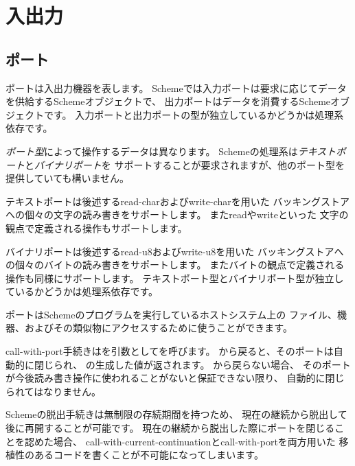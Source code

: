 \section{入出力}

\subsection{ポート}
\label{portsection}

ポートは入出力機器を表します。
Schemeでは入力ポートは要求に応じてデータを供給するSchemeオブジェクトで、
出力ポートはデータを消費するSchemeオブジェクトです。
入力ポートと出力ポートの型が独立しているかどうかは処理系依存です。

{\em ポート型}によって操作するデータは異なります。
Schemeの処理系は{\em テキストポート}と{\em バイナリポート}を
サポートすることが要求されますが、他のポート型を提供していても構いません。

テキストポートは後述する{\cf read-char}および{\cf write-char}を用いた
バッキングストアへの個々の文字の読み書きをサポートします。
また{\cf read}や{\cf write}といった
文字の観点で定義される操作もサポートします。

バイナリポートは後述する{\cf read-u8}および{\cf write-u8}を用いた
バッキングストアへの個々のバイトの読み書きをサポートします。
またバイトの観点で定義される操作も同様にサポートします。
テキストポート型とバイナリポート型が独立しているかどうかは処理系依存です。

ポートはSchemeのプログラムを実行しているホストシステム上の
ファイル、機器、およびその類似物にアクセスするために使うことができます。

\begin{entry}{%
}

{\cf call-with-port}手続きはを引数としてを呼びます。
から戻ると、そのポートは自動的に閉じられ、
の生成した値が返されます。
から戻らない場合、
そのポートが今後読み書き操作に使われることがないと保証できない限り、
自動的に閉じられてはなりません。

\begin{rationale}
Schemeの脱出手続きは無制限の存続期間を持つため、
現在の継続から脱出して後に再開することが可能です。
現在の継続から脱出した際にポートを閉じることを認めた場合、
{\cf call-\+with-\+current-\+continuation}と{\cf call-\+with-\+port}を両方用いた
移植性のあるコードを書くことが不可能になってしまいます。
\end{rationale} 

\end{entry}

